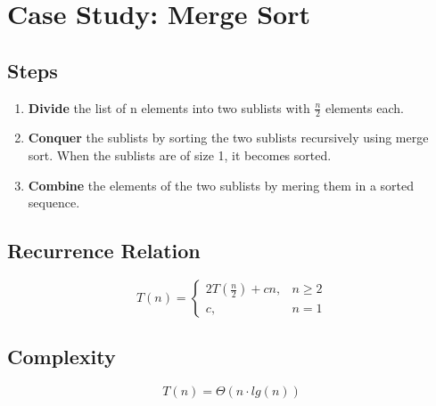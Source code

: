 \section{Case Study: Merge Sort}

\subsection*{Steps}

\begin{enumerate}
	\item \textbf{Divide} the list of n elements into two sublists with $\frac{n}{2}$ elements each.
	\item \textbf{Conquer} the sublists by sorting the two sublists recursively using merge sort. When the sublists are of size 1, it becomes sorted.
	\item \textbf{Combine} the elements of the two sublists by mering them in a sorted sequence.
\end{enumerate}

\subsection*{Recurrence Relation}
$$
T(n) = \begin{cases}
2T\left(\frac{n}{2}\right) + cn, & n \geq 2\\
c, & n = 1
\end{cases}
$$

\subsection*{Complexity}
$$
T(n) = \Theta(n \cdot lg(n))
$$

